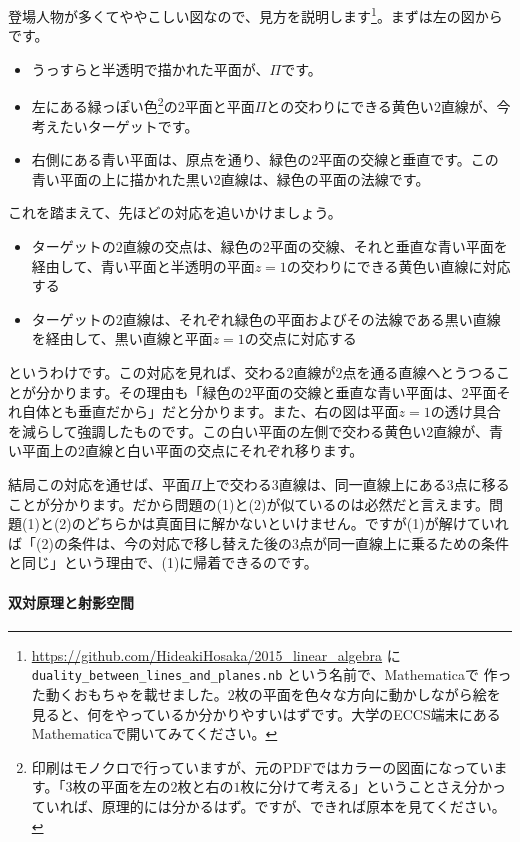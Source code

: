 登場人物が多くてややこしい図なので、見方を説明します\footnote{\url{https://github.com/HideakiHosaka/2015_linear_algebra} に \texttt{duality\_between\_lines\_and\_planes.nb} という名前で、Mathematicaで	作った動くおもちゃを載せました。$2$枚の平面を色々な方向に動かしながら絵を見ると、何をやっているか分かりやすいはずです。大学のECCS端末にあるMathematicaで開いてみてください。}。まずは左の図からです。
\begin{itemize}
\item うっすらと半透明で描かれた平面が、$\Pi$です。
\item 左にある緑っぽい色\footnote{印刷はモノクロで行っていますが、元のPDFではカラーの図面になっています。「$3$枚の平面を左の$2$枚と右の$1$枚に分けて考える」ということさえ分かっていれば、原理的には分かるはず。ですが、できれば原本を見てください。}の$2$平面と平面$\Pi$との交わりにできる黄色い$2$直線が、今考えたいターゲットです。
\item 右側にある青い平面は、原点を通り、緑色の$2$平面の交線と垂直です。この青い平面の上に描かれた黒い$2$直線は、緑色の平面の法線です。
\end{itemize}
これを踏まえて、先ほどの対応を追いかけましょう。
\begin{itemize}
\item ターゲットの$2$直線の交点は、緑色の$2$平面の交線、それと垂直な青い平面を経由して、青い平面と半透明の平面$z = 1$の交わりにできる黄色い直線に対応する
\item ターゲットの$2$直線は、それぞれ緑色の平面およびその法線である黒い直線を経由して、黒い直線と平面$z = 1$の交点に対応する
\end{itemize}
というわけです。この対応を見れば、交わる$2$直線が$2$点を通る直線へとうつることが分かります。その理由も「緑色の$2$平面の交線と垂直な青い平面は、$2$平面それ自体とも垂直だから」だと分かります。また、右の図は平面$z = 1$の透け具合を減らして強調したものです。この白い平面の左側で交わる黄色い$2$直線が、青い平面上の$2$直線と白い平面の交点にそれぞれ移ります。

結局この対応を通せば、平面$\Pi$上で交わる$3$直線は、同一直線上にある$3$点に移ることが分かります。だから問題の(1)と(2)が似ているのは必然だと言えます。問題(1)と(2)のどちらかは真面目に解かないといけません。ですが(1)が解けていれば「(2)の条件は、今の対応で移し替えた後の$3$点が同一直線上に乗るための条件と同じ」という理由で、(1)に帰着できるのです。

\paragraph{双対原理と射影空間}

